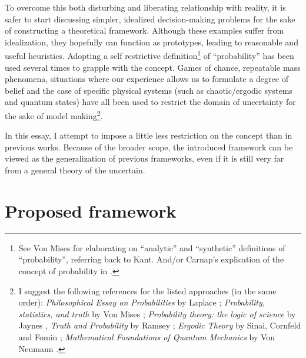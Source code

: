 \documentclass{article}
\begin{document}
To overcome this both disturbing and liberating relationship with reality, it is safer to start discussing simpler, idealized decision-making problems for the sake of constructing a theoretical framework.
Although these examples suffer from idealization, they hopefully can function as prototypes, leading to reasonable and useful heuristics.
Adopting a self restrictive definition\footnote{See Von Mises \cite{book:VonMises} for elaborating on ``analytic'' and ``synthetic'' definitions of ``probability'', referring back to Kant. And/or Carnap's explication of the concept of probability in \cite{book:CarnapLogicalFoundationsOfProbability}.} of ``probability'' has been used several times to grapple with the concept.
Games of chance,
repeatable mass phenomena,
situations where our experience allows us to formulate a degree of belief
and the case of specific physical systems (such as chaotic/ergodic systems
and quantum states)
have all been used to restrict the domain of uncertainty for the sake of model making\footnote
{
I suggest the following references for the listed approaches (in the same order):
\emph{Philosophical Essay on Probabilities} by Laplace \cite{book:Laplace};
\emph{Probability, statistics, and truth} by Von Mises \cite{book:VonMises};
\emph{Probability theory: the logic of science} by Jaynes \cite{book:Jaynes}, \emph{Truth and Probability} by Ramsey \cite{essay:Ramsey};
\emph{Ergodic Theory} by Sinai, Cornfeld and Fomin \cite{book:ErgodicTheory};
\emph{Mathematical Foundations of Quantum Mechanics} by Von Neumann \cite{book:NeumannQuantum}.
}.

In this essay, I attempt to impose a little less restriction on the concept than in previous works.
Because of the broader scope, the introduced framework can be viewed as the generalization of previous frameworks, even if it is still very far from a general theory of the uncertain.

\section*{Proposed framework}
\end{document}
